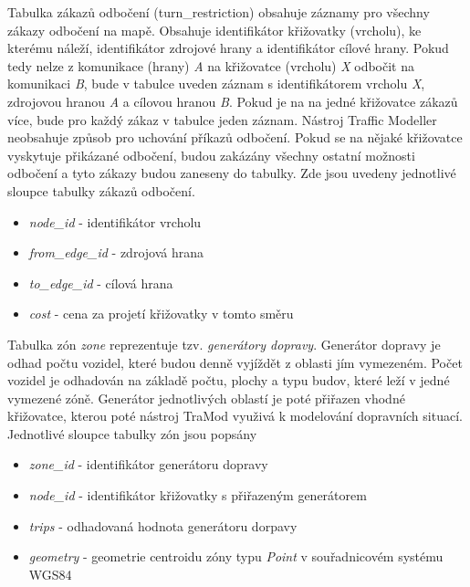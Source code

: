 Tabulka zákazů odbočení (turn\_restriction) obsahuje záznamy pro všechny zákazy odbočení na mapě. Obsahuje identifikátor křižovatky (vrcholu), ke kterému náleží, identifikátor zdrojové hrany a identifikátor cílové hrany. Pokud tedy nelze z komunikace (hrany) \textit{A} na křižovatce (vrcholu) \textit{X} odbočit na komunikaci \textit{B}, bude v tabulce uveden záznam s identifikátorem vrcholu \textit{X}, zdrojovou hranou \textit{A} a cílovou hranou \textit{B}. Pokud je na na jedné křižovatce zákazů více, bude pro každý zákaz v tabulce jeden záznam. Nástroj Traffic Modeller neobsahuje způsob pro uchování příkazů odbočení. Pokud se na nějaké křižovatce vyskytuje přikázané odbočení, budou zakázány všechny ostatní možnosti odbočení a tyto zákazy budou zaneseny do tabulky. Zde jsou uvedeny jednotlivé sloupce tabulky zákazů odbočení. 

\begin{itemize}
  \item \textit{node\_id} - identifikátor vrcholu 
  \item \textit{from\_edge\_id} - zdrojová hrana
  \item \textit{to\_edge\_id} - cílová hrana
  \item \textit{cost} - cena za projetí křižovatky v tomto směru
\end{itemize}
\vspace{10pt}

Tabulka zón \textit{zone} reprezentuje tzv. \textit{generátory dopravy}. Generátor dopravy je odhad počtu vozidel, které budou denně vyjíždět z oblasti jím vymezeném. Počet vozidel je odhadován na základě počtu, plochy a typu budov, které leží v jedné vymezené zóně. Generátor jednotlivých oblastí je poté přiřazen vhodné křižovatce, kterou poté nástroj TraMod využivá k modelování dopravních situací. Jednotlivé sloupce tabulky zón jsou popsány 

\begin{itemize}
  \item \textit{zone\_id} - identifikátor generátoru dopravy
  \item \textit{node\_id} - identifikátor křižovatky s přiřazeným generátorem
  \item \textit{trips} - odhadovaná hodnota generátoru dorpavy
  \item \textit{geometry} - geometrie centroidu zóny typu \textit{Point} v souřadnicovém systému WGS84
\end{itemize}
\vspace{10pt}

